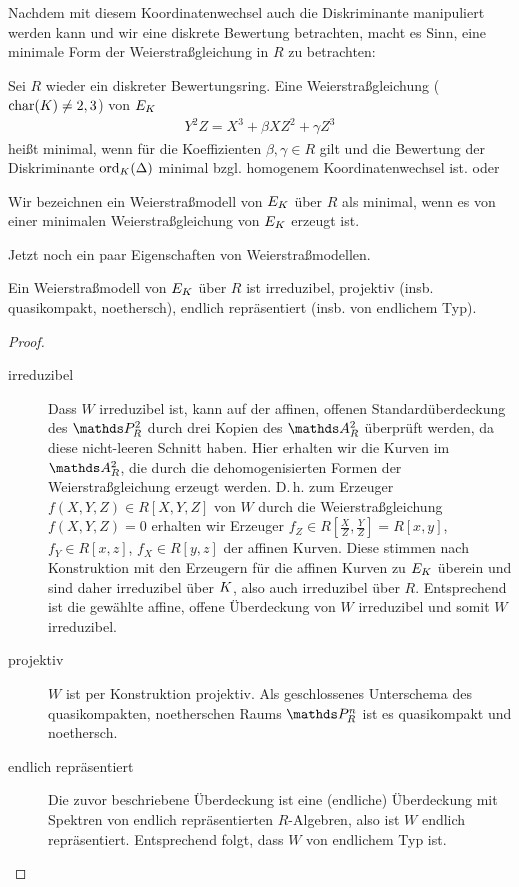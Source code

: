 \documentclass[german]{scrreprt}
\begin{document}
Nachdem mit diesem Koordinatenwechsel auch die Diskriminante
manipuliert werden kann und wir eine diskrete Bewertung betrachten,
macht es Sinn, eine minimale Form der Weierstraßgleichung in $R$ zu
betrachten:
\begin{Definition}
  Sei $R$ wieder ein diskreter Bewertungsring.
  Eine Weierstraßgleichung ($\operatorname{char}(K)\neq2,3$) von $E_{K}$
  \begin{gather*}
    Y^2Z = X^3 + \beta XZ^2 + \gamma Z^3
  \end{gather*}
  heißt minimal, wenn für die Koeffizienten $\beta, \gamma\in R$ gilt
  und die Bewertung der Diskriminante $\operatorname{ord}_{K}(\Delta)$ minimal
  bzgl. homogenem Koordinatenwechsel ist.
  \cite[Chapter 1.5, S.\,22]{neron} oder
  \cite[Chapter VII.1]{silverman}

  Wir bezeichnen ein Weierstraßmodell von $E_{K}$ über $R$ als minimal,
  wenn es von einer minimalen Weierstraßgleichung von $E_{K}$ erzeugt
  ist.
\end{Definition}

Jetzt noch ein paar Eigenschaften von Weierstraßmodellen.

\begin{Lemma}\label{thm:eigweierstrassmodelle}
  Ein Weierstraßmodell von $E_{K}$ über $R$ ist
  irreduzibel,
  projektiv (insb. quasikompakt, noethersch),
  endlich repräsentiert (insb. von endlichem Typ).
  \begin{proof}
    \begin{description}
    \item[irreduzibel]
      Dass $W$ irreduzibel ist, kann auf der affinen, offenen
      Standardüberdeckung des $\P_R^2$ durch drei Kopien des $\A_R^2$
      überprüft werden, da diese nicht-leeren Schnitt haben. Hier
      erhalten wir die Kurven im $\A_R^2$, die durch die
      dehomogenisierten Formen der Weierstraßgleichung erzeugt
      werden. D.\,h. zum Erzeuger $f(X,Y,Z)\in R[X,Y,Z]$ von $W$ durch 
      die Weierstraßgleichung $f(X,Y,Z)=0$  erhalten wir Erzeuger
      $f_Z\in R[\frac{X}{Z},\frac{Y}{Z}]=R[x,y]$, $f_Y\in R[x,z]$,
      $f_X\in R[y,z]$ der affinen Kurven.
      Diese stimmen nach Konstruktion mit den Erzeugern für die affinen
      Kurven zu $E_{K}$ überein und sind daher irreduzibel über $K$,
      also auch irreduzibel über $R$.
      Entsprechend ist die gewählte affine, offene Überdeckung von $W$
      irreduzibel und somit $W$ irreduzibel.
    \item[projektiv] $W$ ist per Konstruktion projektiv. Als
      geschlossenes Unterschema des quasikompakten, noetherschen Raums
      $\P_R^n$ ist es quasikompakt und noethersch.
    \item[endlich repräsentiert]
      Die zuvor beschriebene Überdeckung ist eine (endliche)
      Überdeckung mit Spektren von endlich repräsentierten $R$-Algebren,
      also ist $W$ endlich repräsentiert.
      Entsprechend folgt, dass $W$ von endlichem Typ ist.
    \end{description}
  \end{proof}
\end{Lemma}
\end{document}
